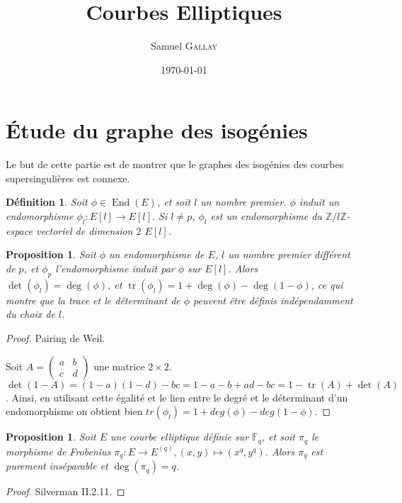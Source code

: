 \documentclass{article}
\title{Courbes Elliptiques}
\author{Samuel \textsc{Gallay}}
\date{\today}
\theoremstyle{plain}%
\newtheorem{prop}[thm]{Proposition}
\newtheorem{deff}[thm]{Définition}
\theoremstyle{definition}%
\newcommand{\F}{\mathbb{F}}
\newcommand{\Z}{\mathbb{Z}}
\DeclareMathOperator{\End}{End}
\DeclareMathOperator{\tr}{tr}
\begin{document}
\maketitle


\section{Étude du graphe des isogénies}

Le but de cette partie est de montrer que le graphes des isogénies des courbes supersingulières est connexe.

\begin{deff}
  Soit $\phi\in \End(E)$, et soit $l$ un nombre premier. $\phi$ induit un endomorphisme $\phi_l : E[l] \to E[l]$. Si $l\neq p$, $\phi_l$ est un endomorphisme du $\Z/l\Z$-espace vectoriel de dimension $2$ $E[l]$. 
\end{deff}

\begin{prop}
  \label{dettr}
  Soit $\phi$ un endomorphisme de $E$, $l$ un nombre premier différent de $p$, et $\phi_p$ l'endomorphisme induit par $\phi$ sur $E[l]$. Alors $\det(\phi_l) = \deg(\phi)$, et $\tr(\phi_l) = 1 + \deg(\phi) - \deg(1-\phi)$, ce qui montre que la trace et le déterminant de $\phi$ peuvent être définis indépendamment du choix de $l$.
\end{prop}

\begin{proof}
  Pairing de Weil.

  Soit $ A = \begin{pmatrix} a & b \\ c & d \end{pmatrix}$ une matrice $2\times 2$. $\det(1-A) = (1-a)(1-d) - bc = 1 -a -b + ad -bc = 1 - \tr(A) + \det(A)$. Ainsi, en utilisant cette égalité et le lien entre le degré et le déterminant d'un endomorphisme on obtient bien $tr(\phi_l) = 1 + deg(\phi) - deg(1-\phi)$.   
\end{proof}

\begin{prop}
  \label{degpi}
  Soit $E$ une courbe elliptique définie sur $\F_q$, et soit $\pi_q$ le morphisme de Frobenius $\pi_q : E \to E^{(q)}, (x, y) \mapsto (x^q, y^q)$. Alors $\pi_q$ est purement inséparable et $\deg(\pi_q) =q$.
\end{prop}

\begin{proof}
  Silverman II.2.11.
\end{proof}
\end{document}
